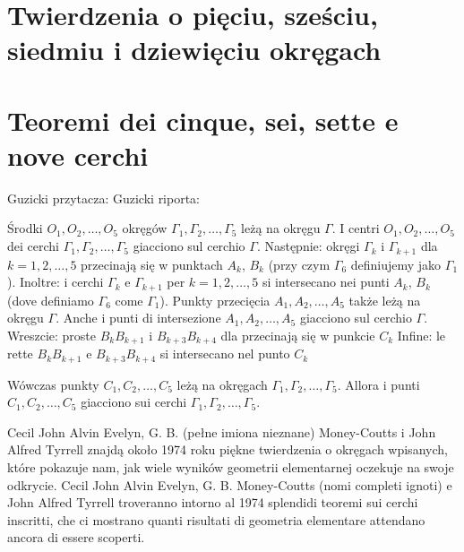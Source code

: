 %

\section{Twierdzenia o pięciu, sześciu, siedmiu i dziewięciu okręgach} %
\section{Teoremi dei cinque, sei, sette e nove cerchi} %
\label{sssection_6_7_9_circles}%

Guzicki \cite[s. 36]{guzicki_2021} przytacza: %
Guzicki \cite[p. 36]{guzicki_2021} riporta: %

\begin{proposition}
[o pięciu okręgach] %
[dei cinque cerchi] %
    Środki $O_1, O_2, \ldots, O_5$ okręgów $\Gamma_1, \Gamma_2, \ldots, \Gamma_5$ leżą na okręgu $\Gamma$. %
    I centri $O_1, O_2, \ldots, O_5$ dei cerchi $\Gamma_1, \Gamma_2, \ldots, \Gamma_5$ giacciono sul cerchio $\Gamma$. %
    Następnie: okręgi $\Gamma_{k}$ i $\Gamma_{k+1}$ dla $k = 1, 2, \ldots, 5$ przecinają się w punktach $A_k$, $B_k$ (przy czym $\Gamma_6$ definiujemy jako $\Gamma_1$). %
    Inoltre: i cerchi $\Gamma_{k}$ e $\Gamma_{k+1}$ per $k = 1, 2, \ldots, 5$ si intersecano nei punti $A_k$, $B_k$ (dove definiamo $\Gamma_6$ come $\Gamma_1$). %
    Punkty przecięcia $A_1, A_2, \ldots, A_5$ także leżą na okręgu $\Gamma$. %
    Anche i punti di intersezione $A_1, A_2, \ldots, A_5$ giacciono sul cerchio $\Gamma$. %
    Wreszcie: proste $B_kB_{k+1}$ i $B_{k+3}B_{k+4}$ dla przecinają się w punkcie $C_k$ %
    Infine: le rette $B_kB_{k+1}$ e $B_{k+3}B_{k+4}$ si intersecano nel punto $C_k$ %

    Wówczas punkty $C_1, C_2, \ldots, C_5$ leżą na okręgach $\Gamma_1, \Gamma_2, \ldots, \Gamma_5$. %
    Allora i punti $C_1, C_2, \ldots, C_5$ giacciono sui cerchi $\Gamma_1, \Gamma_2, \ldots, \Gamma_5$. %
\end{proposition}

Cecil John Alvin Evelyn, G. B. (pełne imiona nieznane) Money-Coutts i John Alfred Tyrrell znajdą około 1974 roku piękne twierdzenia o okręgach wpisanych, które pokazuje nam, jak wiele wyników geometrii elementarnej oczekuje na swoje odkrycie. %
Cecil John Alvin Evelyn, G. B. Money-Coutts (nomi completi ignoti) e John Alfred Tyrrell troveranno intorno al 1974 splendidi teoremi sui cerchi inscritti, che ci mostrano quanti risultati di geometria elementare attendano ancora di essere scoperti. %
%
%
%

